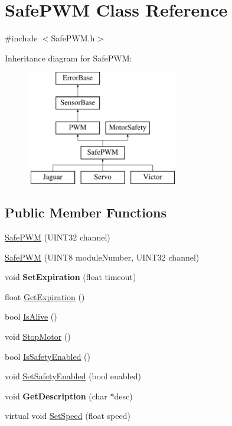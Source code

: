 \hypertarget{classSafePWM}{
\section{SafePWM Class Reference}
\label{classSafePWM}
}


{\ttfamily \#include $<$SafePWM.h$>$}

Inheritance diagram for SafePWM:\begin{figure}[H]
\begin{center}
\leavevmode
\includegraphics[height=5.000000cm]{classSafePWM}
\end{center}
\end{figure}
\subsection*{Public Member Functions}
\begin{DoxyCompactItemize}
\item 
\hyperlink{classSafePWM_a00a1366b4da440711a1f02d037950a2f}{SafePWM} (UINT32 channel)
\item 
\hyperlink{classSafePWM_a9dc9f132890758d8ecb4f207208d76e3}{SafePWM} (UINT8 moduleNumber, UINT32 channel)
\item 
\hypertarget{classSafePWM_a30ee2880db771df845a8fe47f3184953}{
void {\bfseries SetExpiration} (float timeout)}
\label{classSafePWM_a30ee2880db771df845a8fe47f3184953}

\item 
float \hyperlink{classSafePWM_a81eae699cc4663f0812dfb7737c56281}{GetExpiration} ()
\item 
bool \hyperlink{classSafePWM_aebfc9f69eff62ed8180c2991b25ad043}{IsAlive} ()
\item 
void \hyperlink{classSafePWM_a66a27761982521795879b6067d81a6dc}{StopMotor} ()
\item 
bool \hyperlink{classSafePWM_a8303289bd3ecd52d7764f7bb593a3474}{IsSafetyEnabled} ()
\item 
void \hyperlink{classSafePWM_a882453a32c881e9114623072b7d905e5}{SetSafetyEnabled} (bool enabled)
\item 
\hypertarget{classSafePWM_a129350f9b383bad68f9b526d24c96ea3}{
void {\bfseries GetDescription} (char $\ast$desc)}
\label{classSafePWM_a129350f9b383bad68f9b526d24c96ea3}

\item 
virtual void \hyperlink{classSafePWM_af1ed936d88f3ee6446b01c17feb24b78}{SetSpeed} (float speed)
\end{DoxyCompactItemize}


